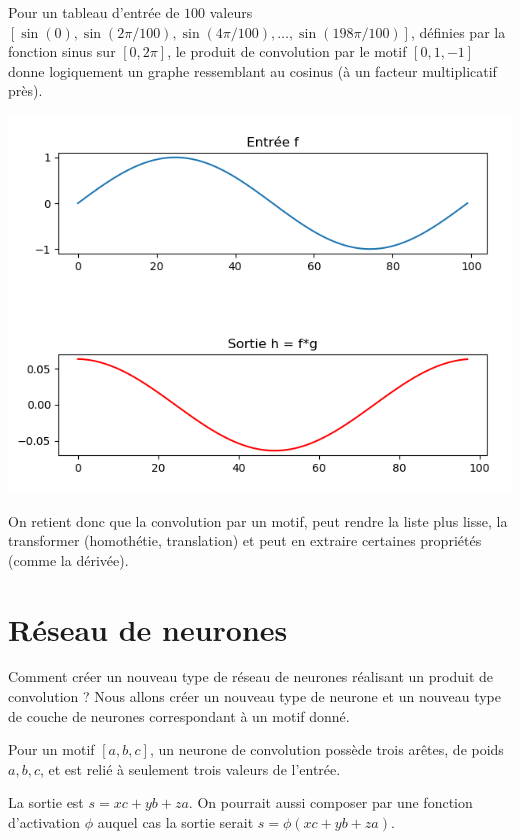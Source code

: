 \documentclass[11pt,class=report,crop=false]{standalone}
\begin{document}
Pour un tableau d'entrée de $100$ valeurs $[\sin(0),\sin(2\pi/100),\sin(4\pi/100),\ldots,\sin(198\pi/100)]$, définies par la fonction sinus sur $[0,2\pi]$, le produit de convolution par le motif $[0,1,-1]$ donne logiquement un graphe ressemblant au cosinus (à un facteur multiplicatif près).
\begin{center}
\includegraphics[scale=\myscale,scale=0.6]{figures/convolution-1d-4}
\end{center}


On retient donc que la convolution par un motif, peut rendre la liste plus lisse, la transformer (homothétie, translation) et peut en extraire certaines propriétés (comme la dérivée).


\section{Réseau de neurones}


Comment créer un nouveau type de réseau de neurones réalisant un produit de convolution ?
Nous allons créer un nouveau type de neurone et un nouveau type de couche de neurones correspondant à un motif donné.

Pour un motif  $[a,b,c]$, un neurone de convolution possède trois arêtes, de poids $a,b,c$, et est relié à seulement trois valeurs de l'entrée.



La sortie est $s=xc+yb+za$. On pourrait aussi composer par une fonction d'activation $\phi$ auquel cas la sortie serait $s=\phi(xc+yb+za)$.
\end{document}
